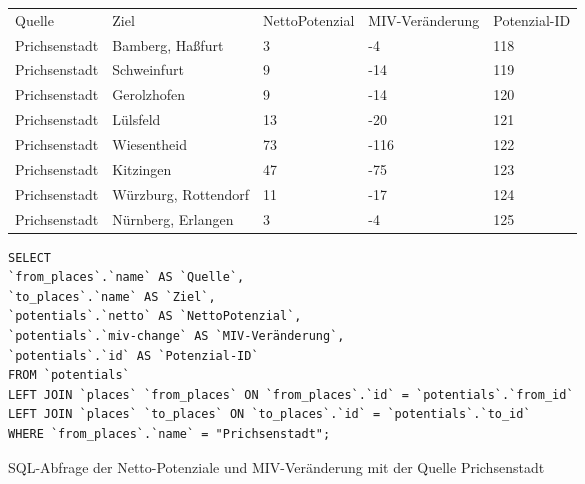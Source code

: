 \begin{tabularx}{\textwidth}{*5{X}}
Quelle & Ziel & NettoPotenzial & MIV-Veränderung & Potenzial-ID\\ 
Prichsenstadt & Bamberg, Haßfurt & 3 & -4 & 118\\ 
Prichsenstadt & Schweinfurt & 9 & -14 & 119\\ 
Prichsenstadt & Gerolzhofen & 9 & -14 & 120\\ 
Prichsenstadt & Lülsfeld & 13 & -20 & 121\\ 
Prichsenstadt & Wiesentheid & 73 & -116 & 122\\ 
Prichsenstadt & Kitzingen & 47 & -75 & 123\\ 
Prichsenstadt & Würzburg, Rottendorf & 11 & -17 & 124\\ 
Prichsenstadt & Nürnberg, Erlangen & 3 & -4 & 125\\ 
\end{tabularx}    
\newline
\newline
\begin{listing}[htbp]
\begin{verbatim}
SELECT
`from_places`.`name` AS `Quelle`, 
`to_places`.`name` AS `Ziel`, 
`potentials`.`netto` AS `NettoPotenzial`, 
`potentials`.`miv-change` AS `MIV-Veränderung`, 
`potentials`.`id` AS `Potenzial-ID`
FROM `potentials`
LEFT JOIN `places` `from_places` ON `from_places`.`id` = `potentials`.`from_id`
LEFT JOIN `places` `to_places` ON `to_places`.`id` = `potentials`.`to_id`
WHERE `from_places`.`name` = "Prichsenstadt";
\end{verbatim}
\caption{SQL-Abfrage der Netto-Potenziale und MIV-Veränderung mit der Quelle Prichsenstadt}\label{lst-fz-prichsenstadt}
\end{listing}